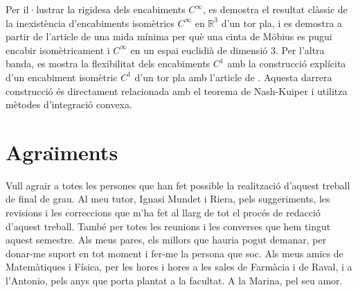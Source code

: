 \documentclass[11pt,a4paper,openright,oneside]{book}
\numberwithin{equation}{section}
\theoremstyle{definition}
\begin{document}
Per il·lustrar la rigidesa dels encabiments $C^\infty$, es demostra el resultat clàssic de la inexistència d'encabiments isomètrics $C^\infty$ en $\mathbb R^3$ d'un tor pla, i es demostra a partir de l'article de \citet{schwartz2024} una mida mínima per què una cinta de Möbius es pugui encabir isomètricament i $C^\infty$ en un espai euclidià de dimensió 3. Per l'altra banda, es mostra la flexibilitat dels encabiments $C^1$ amb la construcció explícita d'un encabiment isomètric $C^1$ d'un tor pla amb l'article de \citet{borrelli2013}. Aquesta darrera construcció és directament relacionada amb el teorema de Nash-Kuiper i utilitza mètodes d'integració convexa.

\newpage 


\section*{Agra\"{\i}ments}
Vull agrair a totes les persones que han fet possible la realització d'aquest treball de final de grau.
Al meu tutor, Ignasi Mundet i Riera, pels suggeriments, les revisions i les correccions que m'ha fet al llarg de tot el procés de redacció d'aquest treball. També per totes les reunions i les converses que hem tingut aquest semestre.
Als meus pares, els millors que hauria pogut demanar, per donar-me suport en tot moment i fer-me la persona que soc.
Als meus amics de Matemàtiques i Física, per les hores i hores a les sales de Farmàcia i de Raval, i a l'Antonio, pels anys que porta plantat a la facultat.
A la Marina, pel seu amor.

\newpage

\tableofcontents

\newpage








%



\normalfont
\end{document}
